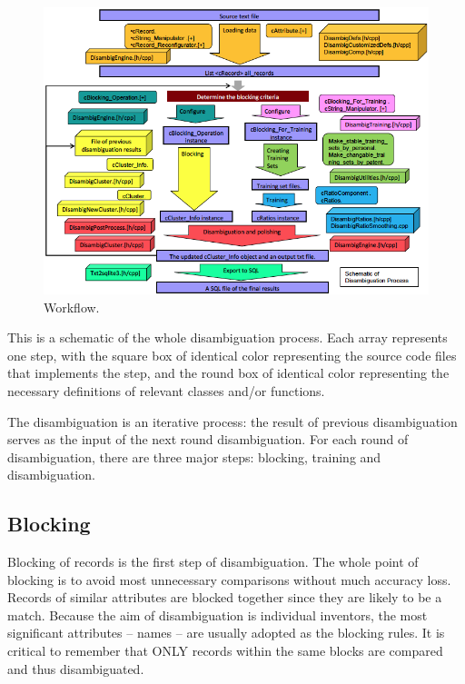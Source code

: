 \documentclass{article}
\begin{document}
\begin{figure}
\begin{center}
\includegraphics[width=6in]{images/disambiguation_workflow.png}
\caption{Workflow.}
\label{fig:workflow}
\end{center}
\end{figure}



This is a schematic of the whole disambiguation process.
Each array represents one step, with the
square box of identical color representing the source
code files that implements the step, and the round
box of identical color representing the necessary
definitions of relevant classes and/or functions.


The disambiguation is an iterative process: 
the result of previous disambiguation serves as the input of
the next round disambiguation. For each round of disambiguation,
there are three major steps: blocking, training and disambiguation.

\subsection{Blocking}

Blocking of records is the first step of disambiguation.
The whole point of blocking is to avoid most
unnecessary comparisons without much accuracy loss. Records
of similar attributes are blocked
together since they are likely to be a match. Because the
aim of disambiguation is individual inventors,
the most significant attributes – names – are
usually adopted as the blocking rules. It is critical to
remember that ONLY records within the same blocks are
compared and thus disambiguated.
\end{document}
